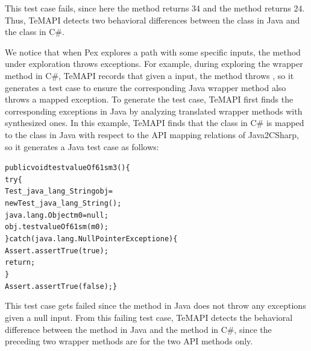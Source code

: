 This test case fails, since here the  method returns 34 and the  method returns 24. Thus, TeMAPI detects two behavioral differences between the  class in Java and the  class in C\#.


We notice that when Pex explores a path with some specific inputs, the method under exploration throws exceptions.
For example, during exploring the  wrapper method in C\#, TeMAPI records that given a  input, the method throws , so it generates a test case to ensure the corresponding Java wrapper method also throws a mapped exception. To generate the test case, TeMAPI first finds the corresponding exceptions in Java by analyzing translated wrapper methods with synthesized ones. In this example, TeMAPI finds that the  class in C\# is mapped to the  class in Java with respect to the API mapping relations of Java2CSharp, so it generates a Java test case as follows:

\begin{CodeOut}\vspace*{-1ex}
\begin{alltt}
 public void testvalueOf61sm3()\{
   try\{
     Test_java_lang_String obj =
           new Test_java_lang_String();
     java.lang.Object m0 = null;
     obj.testvalueOf61sm(m0);
   \}catch(java.lang.NullPointerException e)\{
     Assert.assertTrue(true);
     return;
   \}
   Assert.assertTrue(false); \}
\end{alltt}
\end{CodeOut}\vspace*{-1ex}

This test case gets failed since the  method in Java does not throw any exceptions given a null input.
From this failing test case, TeMAPI detects the behavioral difference between the  method in Java and the  method in C\#, since the preceding two wrapper methods are for the two API methods only.

